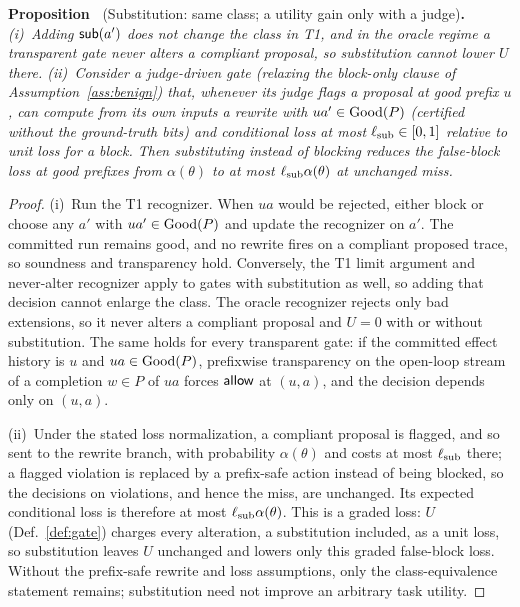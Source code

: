 \medskip
\noindent{}\textbf{Proposition~\theproposition} (Substitution: same class; a utility gain only with a judge)\textbf{.}
\emph{(i)~Adding $\mathsf{sub}(a')$ does not change the class in T1, and in the oracle regime a
transparent gate never alters a compliant proposal, so substitution cannot lower $U$ there.
(ii)~Consider a judge-driven gate (relaxing the block-only clause of
Assumption~\ref{ass:benign}) that, whenever its judge flags a proposal at good prefix $u$, can
compute from its own inputs a rewrite with $ua'\in\mathrm{Good}(P)$ (certified without the
ground-truth bits) and conditional loss at most $\ell_{\rm sub}\in[0,1]$ relative to unit loss
for a block. Then substituting instead of blocking reduces the false-block loss at good prefixes from
$\alpha(\theta)$ to at most $\ell_{\rm sub}\alpha(\theta)$ at unchanged miss.}
\begin{proof}
(i)~Run the T1 recognizer. When $ua$ would be rejected, either block or choose any
$a'$ with $ua'\in\mathrm{Good}(P)$ and update the recognizer on $a'$. The committed
run remains good, and no rewrite fires on a compliant proposed trace, so
soundness and transparency hold. Conversely, the T1 limit argument and
never-alter recognizer apply to gates with substitution as well, so adding that
decision cannot enlarge the class. The oracle recognizer rejects only bad extensions, so it
never alters a compliant proposal and $U=0$ with or without substitution. The same holds for every transparent gate: if the committed
effect history is $u$ and $ua\in\mathrm{Good}(P)$, prefixwise transparency on the open-loop stream of a
completion $w\in P$ of $ua$ forces $\mathsf{allow}$ at $(u,a)$, and the decision depends only on $(u,a)$.

(ii)~Under the stated loss normalization, a compliant proposal is flagged, and so sent to
the rewrite branch, with probability $\alpha(\theta)$ and costs at most
$\ell_{\rm sub}$ there; a flagged violation is replaced by a prefix-safe action instead of
being blocked, so the decisions on violations, and hence the miss, are unchanged. Its expected conditional loss is therefore at most
$\ell_{\rm sub}\alpha(\theta)$. This is a graded loss: $U$ (Def.~\ref{def:gate}) charges every alteration, a substitution
included, as a unit loss, so substitution leaves $U$ unchanged and lowers only this graded
false-block loss. Without the prefix-safe rewrite and loss
assumptions, only the class-equivalence statement remains; substitution need not
improve an arbitrary task utility.
\end{proof}

